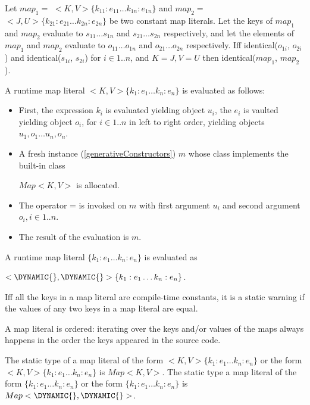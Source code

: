 \documentclass{article}
\newcommand{\code}[1]{{\sf #1}}
\begin{document}
\LMHash{}
Let $map_1 =$ \CONST{}$ <K, V>\{k_{11}:e_{11} \ldots k_{1n} :e_{1n}\}$ and  $map_2 =$  \CONST{}$ <J, U>\{k_{21}:e_{21} \ldots k_{2n} :e_{2n}\}$ be two constant map literals. Let the keys of $map_1$ and $map_2$ evaluate to  $s_{11} \ldots  s_{1n}$  and   $s_{21} \ldots  s_{2n}$ respectively, and let the elements of $map_1$ and $map_2$ evaluate to $o_{11} \ldots  o_{1n}$ and $o_{21} \ldots  o_{2n}$ respectively. Iff \code{identical($o_{1i}$, $o_{2i}$)}  and \code{identical($s_{1i}$, $s_{2i}$)} for $i \in 1.. n$, and $K = J, V = U$ then \code{identical($map_1$, $map_2$)}.


\LMHash{}
A runtime map literal $<K, V>\{k_1:e_1\ldots k_n :e_n\}$  is evaluated as follows:
\begin{itemize}
\item
First, the expression $k_i$ is evaluated yielding object $u_i$, the $e_i$ is vaulted yielding object $o_i$, for $i \in 1..n$ in left to right order, yielding objects $u_1, o_1\ldots u_n, o_n$.
\item  A fresh instance (\ref{generativeConstructors}) $m$ whose class implements the built-in class

 $Map<K, V>$ is allocated.
\item
The operator \code{[]=} is invoked on $m$ with  first  argument $u_i$ and second argument $o_i,  i \in 1.. n$.
\item
The result of the evaluation is $m$.
\end{itemize}


\LMHash{}
A runtime map literal  $\{k_1:e_1\ldots k_n :e_n\}$ is evaluated as

$<\DYNAMIC{},  \DYNAMIC{}>\{k_1:e_1\ldots k_n :e_n\}$.

\LMHash{}
Iff all the keys in a map literal are compile-time constants, it is a static warning if the values of any two keys in a map literal are equal.

\LMHash{}
A map literal is ordered: iterating over the keys and/or values of the maps always happens in the
 order the keys appeared in the source code.


\LMHash{}
The static type of a map literal of the form  \CONST{}$ <K, V>\{k_1:e_1\ldots k_n :e_n\}$ or the form $<K, V>\{k_1:e_1\ldots k_n :e_n\}$ is $Map<K, V>$. The static type a map literal of the form  \CONST{}$\{k_1:e_1\ldots k_n :e_n\}$ or the form $\{k_1:e_1\ldots k_n :e_n\}$ is $Map<\DYNAMIC{},  \DYNAMIC{}>$.
\end{document}

